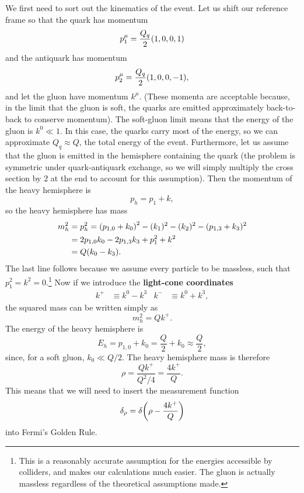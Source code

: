 \documentclass[../thesis.tex]{subfiles}
\begin{document}
	We first need to sort out the kinematics of the event. Let us shift our reference frame so that the quark has momentum
	\begin{equation}
		p_1^\mu = \frac{Q_q}{2}\qty(1, 0, 0, 1)
	\end{equation}
	and the antiquark has momentum
	\begin{equation}
		p_2^\mu = \frac{Q_q}{2}\qty(1, 0, 0, -1),
	\end{equation}
	and let the gluon have momentum $k^\mu$. (These momenta are acceptable because, in the limit that the gluon is soft, the quarks are emitted approximately back-to-back to conserve momentum). The soft-gluon limit means that the energy of the gluon is $k^0 \ll 1$. In this case, the quarks carry most of the energy, so we can approximate $Q_q \approx Q$, the total energy of the event. Furthermore, let us assume that the gluon is emitted in the hemisphere containing the quark (the problem is symmetric under quark-antiquark exchange, so we will simply multiply the cross section by $2$ at the end to account for this assumption). Then the momentum of the heavy hemisphere is
	\begin{equation}
		p_h = p_1 + k,
	\end{equation}
	so the heavy hemisphere has mass
	\begin{equation}
	\begin{aligned}
		m_h^2 &= p_h^2 = \qty(p_{1, 0} + k_0)^2 - (k_1)^2 - (k_2)^2 - (p_{1, 3} + k_3)^2 \\
		&= 2p_{1, 0}k_0 - 2p_{1, 3}k_3 + p_1^2 + k^2 \\
		&= Q(k_0 - k_3).
	\end{aligned}
	\end{equation}
	The last line follows because we assume every particle to be massless, such that $p_1^2 = k^2 = 0$.\footnote{This is a reasonably accurate assumption for the energies accessible by colliders, and makes our calculations much easier. The gluon is actually massless regardless of the theoretical assumptions made.} Now if we introduce the \textbf{light-cone coordinates}
	\begin{align}
		k^+ &\equiv k^0 - k^3 & k^- &\equiv k^0 + k^3,
	\end{align}
	the squared mass can be written simply as
	\begin{equation}
		m_h^2 = Q k^+.
	\end{equation}
	The energy of the heavy hemisphere is
	\begin{equation}
		E_h = p_{1, 0} + k_0 = \frac{Q}{2} + k_0 \approx \frac{Q}{2},
	\end{equation}
	since, for a soft gluon, $k_0 \ll Q/2$. The heavy hemisphere mass is therefore
	\begin{equation}\label{leading-eq:soft mass}
		\rho = \frac{Q k^+}{Q^2 / 4} = \frac{4k^+}{Q}.
	\end{equation}
	This means that we will need to insert the measurement function
	\begin{equation}
		\delta_\rho = \delta\qty(\rho - \frac{4k^+}{Q})
	\end{equation}
	into Fermi's Golden Rule.
\end{document}
